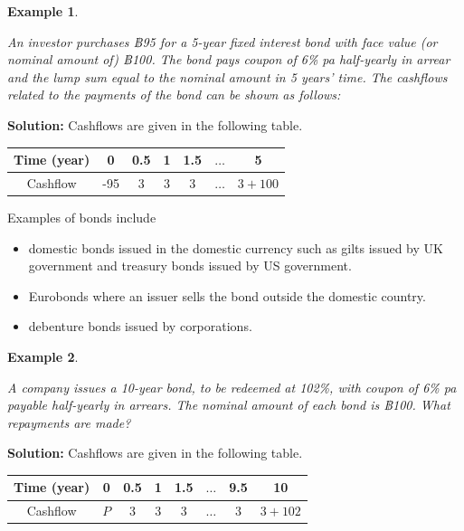 \documentclass[landscape, 20pt]{extreport}
\theoremstyle{definition}
\theoremstyle{definition}
\newtheorem{example}{Example}[chapter]
\theoremstyle{definition}
\theoremstyle{definition}
\theoremstyle{remark}
\begin{document}
\newpage \begin{example}
\protect\hypertarget{exm:unlabeled-div-47}{}\label{exm:unlabeled-div-47}

\emph{An investor purchases ฿95 for a 5-year fixed interest
bond with face value (or nominal amount of) ฿100. The bond pays coupon
of 6\% pa half-yearly in arrear and the lump sum equal to the nominal
amount in 5 years' time. The cashflows related to the payments of the
bond can be shown as follows:}

\end{example}

\textbf{Solution:} Cashflows are given in the following table.

\begin{longtable}[]{@{}ccccccc@{}}
\toprule
Time (year) & 0 & 0.5 & 1 & 1.5 & \(\ldots\) & 5 \\
\midrule
\endhead
Cashflow & -95 & 3 & 3 & 3 & \(\ldots\) & \(3 + 100\) \\
\bottomrule
\end{longtable}

Examples of bonds include

\begin{itemize}
\item
  domestic bonds issued in the domestic currency such as gilts issued
  by UK government and treasury bonds issued by US government.
\item
  Eurobonds where an issuer sells the bond outside the domestic
  country.
\item
  debenture bonds issued by corporations.
\end{itemize}

\newpage \begin{example}
\protect\hypertarget{exm:exampleBondPrice}{}\label{exm:exampleBondPrice}

\emph{A company issues a 10-year bond, to be redeemed at
102\%, with coupon of 6\% pa payable half-yearly in arrears. The nominal
amount of each bond is ฿100. What repayments are made?}

\end{example}

\textbf{Solution:} Cashflows are given in the following table.

\begin{longtable}[]{@{}cccccccc@{}}
\toprule
Time (year) & 0 & 0.5 & 1 & 1.5 & \(\ldots\) & 9.5 & 10 \\
\midrule
\endhead
Cashflow & \(P\) & 3 & 3 & 3 & \(\ldots\) & \(3\) & \(3 + 102\) \\
\bottomrule
\end{longtable}
\end{document}
